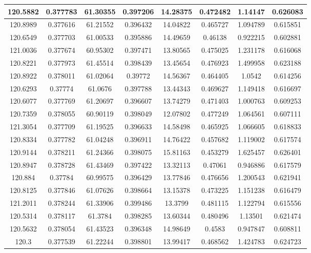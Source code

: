\documentclass[preprint,review,11pt]{elsarticle}
\begin{document}
\begin{longtable}{|c|c|c|c|c|c|c|c|}
				120.5882 & 0.377783 & 61.30355 & 0.397206 & 14.28375 & 0.472482 & 1.14147  & 0.626083 \\ \hline
				120.8989 & 0.377616 & 61.21552 & 0.396432 & 14.04822 & 0.465727 & 1.094789 & 0.615851 \\ \hline
				120.6549 & 0.377703 & 61.00533 & 0.395886 & 14.49659 & 0.46138  & 0.922215 & 0.602881 \\ \hline
				121.0036 & 0.377674 & 60.95302 & 0.397471 & 13.80565 & 0.475025 & 1.231178 & 0.616068 \\ \hline
				120.8221 & 0.377973 & 61.45514 & 0.398439 & 13.45654 & 0.476923 & 1.499958 & 0.623188 \\ \hline
				120.8922 & 0.378011 & 61.02064 & 0.39772  & 14.56367 & 0.464405 & 1.0542   & 0.614256 \\ \hline
				120.6293 & 0.37774  & 61.0676  & 0.397788 & 13.44343 & 0.469627 & 1.149418 & 0.616697 \\ \hline
				120.6077 & 0.377769 & 61.20697 & 0.396607 & 13.74279 & 0.471403 & 1.000763 & 0.609253 \\ \hline
				120.7359 & 0.378055 & 60.90119 & 0.398049 & 12.07802 & 0.477249 & 1.064561 & 0.607111 \\ \hline
				121.3054 & 0.377709 & 61.19525 & 0.396633 & 14.58498 & 0.465925 & 1.066605 & 0.618833 \\ \hline
				120.8334 & 0.377782 & 61.04248 & 0.396911 & 14.76422 & 0.457682 & 1.119002 & 0.617574 \\ \hline
				120.9144 & 0.378211 & 61.24366 & 0.398075 & 15.81163 & 0.453279 & 1.625457 & 0.626401 \\ \hline
				120.8947 & 0.378728 & 61.43469 & 0.397422 & 13.32113 & 0.47061  & 0.946886 & 0.617579 \\ \hline
				120.884  & 0.37784  & 60.99575 & 0.396429 & 13.77846 & 0.476656 & 1.200543 & 0.621941 \\ \hline
				120.8125 & 0.377846 & 61.07626 & 0.398664 & 13.15378 & 0.473225 & 1.151238 & 0.616479 \\ \hline
				121.2011 & 0.378244 & 61.33906 & 0.399486 & 13.3799  & 0.481115 & 1.122794 & 0.615556 \\ \hline
				120.5314 & 0.378117 & 61.3784  & 0.398285 & 13.60344 & 0.480496 & 1.13501  & 0.621474 \\ \hline
				120.5632 & 0.378054 & 61.43523 & 0.396348 & 14.98649 & 0.4583   & 0.947847 & 0.608811 \\ \hline
				120.3    & 0.377539 & 61.22244 & 0.398801 & 13.99417 & 0.468562 & 1.424783 & 0.624723 \\ \hline

\end{longtable}
\end{document}

